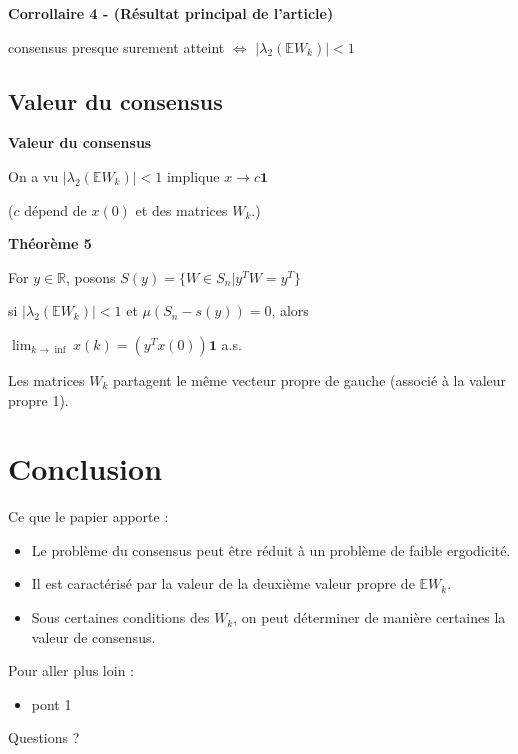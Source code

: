 \documentclass{beamer}
\begin{document}
\begin{frame}
	\textbf{Corrollaire 4 - (Résultat principal de l'article)}
	\begin{center}
		consensus presque surement atteint
		$\iff$
		$|\lambda_{2}(\mathbb{E}W_k)| < 1$
	\end{center}
\end{frame}


\subsection{Valeur du consensus}
\begin{frame}
	\textbf{Valeur du consensus}

	On a vu $| \lambda_2(\mathbb{E}W_k)| < 1$ implique $x \to c\textbf{1}$

	($c$ dépend de $x(0)$ et des matrices $W_k$.)

	\bigbreak
	\pause
	\textbf{Théorème 5}

	For $y \in \mathbb{R}$, posons $S(y) = \{W \in S_n | y^TW = y^T\}$

	si $| \lambda_2(\mathbb{E}W_k)| < 1$ et $\mu (S_n - s(y)) = 0$, alors

	\begin{center}
		$\lim_{k \to \inf}x(k) = (y^Tx(0))\textbf{1}$ \quad a.s.		
	\end{center}
	\pause
	Les matrices $W_k$ partagent le même vecteur propre de gauche
	(associé à la valeur propre 1).
\end{frame}


\section*{Conclusion}
\begin{frame}
	Ce que le papier apporte :
	\begin{itemize}
		\item Le problème du consensus peut être réduit à un problème de faible ergodicité.
		\item Il est caractérisé par la valeur de la deuxième valeur propre de $\mathbb{E}W_k$.
		\item Sous certaines conditions des $W_k$, on peut déterminer de manière certaines la valeur de consensus.
	\end{itemize}
	\pause
	Pour aller plus loin :
	\begin{itemize}
		\item pont 1
	\end{itemize}
\end{frame}

\begin{frame}
	\begin{center}
		\LARGE Questions ?
	\end{center}
\end{frame}
\end{document}
